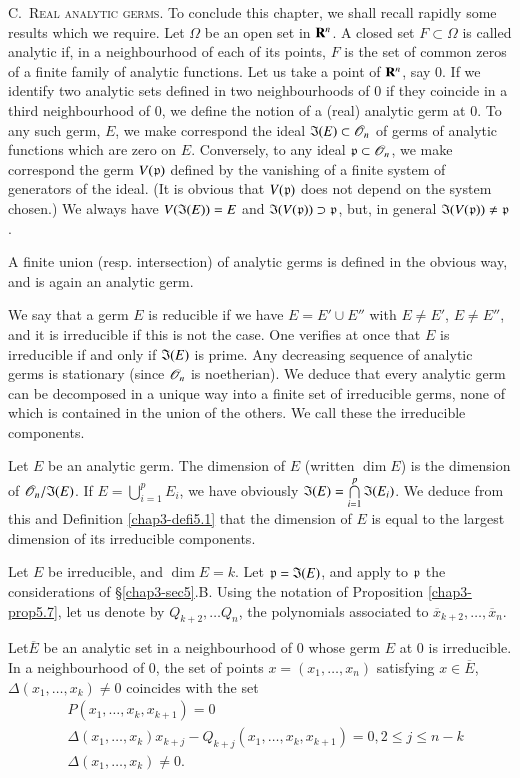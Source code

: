 \noindent
C.\pageoriginale~\textsc{Real analytic germs.} To conclude this chapter, we shall recall rapidly some results which we require. Let $\Omega$ be an open set in $\mathbf{R}^{n}$. A closed set $F\subset \Omega$ is called analytic if, in a neighbourhood of each of its points, $F$ is the set of common zeros of a finite family of analytic functions. Let us take a point of $\mathbf{R}^{n}$, say $0$. If we identify two analytic sets defined in two neighbourhoods of $0$ if they coincide in a third neighbourhood of $0$, we define the notion of a (real) analytic germ at $0$. To any such germ, $E$, we make correspond the ideal $\mathfrak{I}(E)\subset \mathscr{O}_{n}$ of germs of analytic functions which are zero on $E$. Conversely, to any ideal $\mathfrak{p}\subset \mathscr{O}_{n}$, we make correspond the germ $V(\mathfrak{p})$ defined by the vanishing of a finite system of generators of the ideal. (It is obvious that $V(\mathfrak{p})$ does not depend on the system chosen.) We always have $V(\mathfrak{I}(E))=E$ and $\mathfrak{I}(V(\mathfrak{p}))\supset \mathfrak{p}$, but, in general $\mathfrak{I}(V(\mathfrak{p}))\neq \mathfrak{p}$.

A finite union (resp. intersection) of analytic germs is defined in the obvious way, and is again an analytic germ.

We say that a germ $E$ is reducible if we have $E=E'\cup E''$ with $E\neq E'$, $E\neq E''$, and it is irreducible if this is not the case. One verifies at once that $E$ is irreducible if and only if $\mathfrak{I}(E)$ is prime. Any decreasing sequence of analytic germs is stationary (since $\mathscr{O}_{n}$ is noetherian). We deduce that every analytic germ can be decomposed in a unique way into a finite set of irreducible germs, none of which is contained in the union of the others. We call these the irreducible components.

Let $E$ be an analytic germ. The dimension of $E$ (written $\dim E$) is the dimension of $\mathscr{O}_{n}/\mathfrak{I}(E)$. If $E=\bigcup\limits^{p}_{i=1}E_{i}$, we have obviously $\mathfrak{I}(E)=\bigcap\limits^{p}_{i=1}\mathfrak{I}(E_{i})$. We deduce from this and Definition \ref{chap3-defi5.1} that the dimension of $E$ is equal to the largest dimension of its irreducible components.

Let $E$ be irreducible, and $\dim E=k$. Let $\mathfrak{p}=\mathfrak{I}(E)$, and apply to $\mathfrak{p}$ the considerations of \S\ref{chap3-sec5}.B. Using the notation of Proposition \ref{chap3-prop5.7}, let us denote by $Q_{k+2},\ldots Q_{n}$, the polynomials associated to $\overline{x}_{k+2},\ldots,\overline{x}_{n}$.

\begin{proposition}\label{chap3-prop5.8}
Let\pageoriginale $\overline{E}$ be an analytic set in a neighbourhood of $0$ whose germ $E$ at $0$ is irreducible. In a neighbourhood of $0$, the set of points $x=(x_{1},\ldots,x_{n})$ satisfying $x\in \overline{E}$, $\Delta(x_{1},\ldots,x_{k})\neq 0$ coincides with the set
\begin{align*}
& P(x_{1},\ldots,x_{k},x_{k+1})=0\\
& \Delta(x_{1},\ldots,x_{k})x_{k+j}-Q_{k+j}(x_{1},\ldots,x_{k},x_{k+1})=0, 2\leq j\leq n-k\\
& \Delta (x_{1},\ldots,x_{k})\neq 0.
\end{align*}
\end{proposition}

